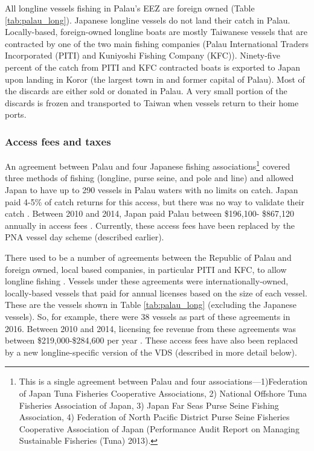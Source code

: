 \documentclass[9p,twocolumn,twoside,lineno]{pnas-new}
\begin{document}


All longline vessels fishing in Palau’s EEZ are foreign owned (Table \ref{tab:palau_long}). Japanese longline vessels do not land their catch in Palau. Locally-based, foreign-owned longline boats are mostly Taiwanese vessels that are contracted by one of the two main fishing companies (Palau International Traders Incorporated (PITI) and Kuniyoshi Fishing Company (KFC)). Ninety-five percent of the catch from PITI and KFC contracted boats is exported to Japan upon landing in Koror (the largest town in and former capital of Palau). Most of the discards are either sold or donated in Palau. A very small portion of the discards is frozen and transported to Taiwan when vessels return to their home ports.




\subsubsection{Access fees and taxes}

An agreement between Palau and four Japanese fishing associations\footnote{This is a single agreement between Palau and four associations—1)Federation of Japan Tuna Fisheries Cooperative Associations, 2) National Offshore Tuna Fisheries Association of Japan, 3) Japan Far Seas Purse Seine Fishing Association, 4) Federation of North Pacific District Purse Seine Fisheries Cooperative Association of Japan (Performance Audit Report on Managing Sustainable Fisheries (Tuna) 2013).} covered three methods of fishing (longline, purse seine, and pole and line) and allowed Japan to have up to 290 vessels in Palau waters with no limits on catch. Japan paid 4-5\% of catch returns for this access, but there was no way to validate their catch \citep{Tewid2013}. Between 2010 and 2014, Japan paid Palau between \$196,100- \$867,120 annually in access fees \citep{Gillett2016}. Currently, these access fees have been replaced by the PNA vessel day scheme (described earlier).
 
There used to be a number of agreements between the Republic of Palau and foreign owned, local based companies, in particular PITI and KFC, to allow longline fishing \cite{Tewid2013}. Vessels under these agreements were internationally-owned, locally-based vessels that paid for annual licenses based on the size of each vessel. These are the vessels shown in Table \ref{tab:palau_long} (excluding the Japanese vessels). So, for example, there were 38 vessels as part of these agreements in 2016. Between 2010 and 2014, licensing fee revenue from these agreements was between \$219,000-\$284,600 per year \citep{Gillett2016}. These access fees have also been replaced by a new longline-specific version of the VDS (described in more detail below).
\end{document}
